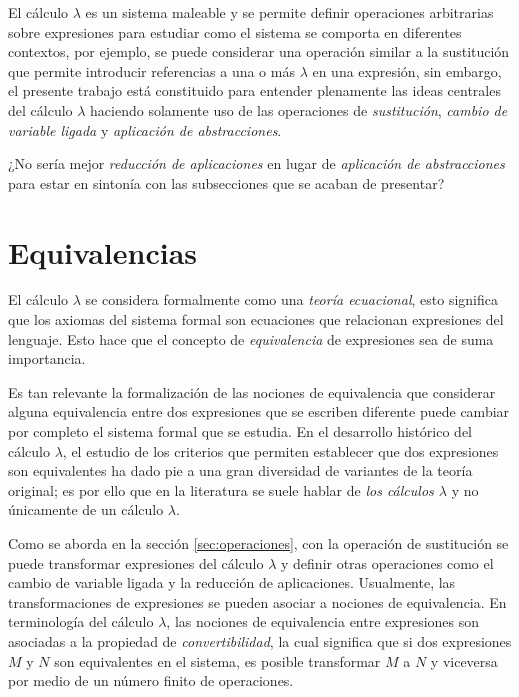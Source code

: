 El cálculo \( λ \) es un sistema maleable y se permite definir operaciones arbitrarias sobre expresiones para estudiar como el sistema se comporta en diferentes contextos, por ejemplo, se puede considerar una operación similar a la sustitución que permite introducir referencias a una o más \( λ \) en una expresión, sin embargo, el presente trabajo está constituido para entender plenamente las ideas centrales del cálculo \( λ \) haciendo solamente uso de las operaciones de \emph{sustitución}, \emph{cambio de variable ligada} y \emph{aplicación de abstracciones}.

\begin{Gutu}
¿No ser\'ia mejor \emph{reducción de aplicaciones} en lugar de  \emph{aplicación de abstracciones} para estar en sintonía con las subsecciones que se acaban de presentar?
\end{Gutu}

\section{Equivalencias}
\label{sec:equivalencias}

El cálculo \( λ \) se considera formalmente como una \emph{teoría ecuacional}, esto significa que los axiomas del sistema formal son ecuaciones que relacionan expresiones del lenguaje. Esto hace que el concepto de \emph{equivalencia} de expresiones sea de suma importancia.

Es tan relevante la formalización de las nociones de equivalencia que considerar alguna equivalencia entre dos expresiones que se escriben diferente puede cambiar por completo el sistema formal que se estudia. En el desarrollo histórico del cálculo \( λ \), el estudio de los criterios que permiten establecer que dos expresiones son equivalentes ha dado pie a una gran diversidad de variantes de la teoría original; es por ello que en la literatura se suele hablar de \emph{los cálculos \( λ \)} y no únicamente de un cálculo \( λ \).

Como se aborda en la sección \ref{sec:operaciones}, con la operación de sustitución se puede transformar expresiones del cálculo \( λ \) y definir otras operaciones como el cambio de variable ligada y la reducción de aplicaciones. Usualmente, las transformaciones de expresiones se pueden asociar a nociones de equivalencia. En terminología del cálculo \( λ \), las nociones de equivalencia entre expresiones son asociadas a la propiedad de \emph{convertibilidad}, la cual significa que si dos expresiones \( M \) y \( N \) son equivalentes en el sistema, es posible transformar \( M \) a \( N \) y viceversa por medio de un número finito de operaciones.

